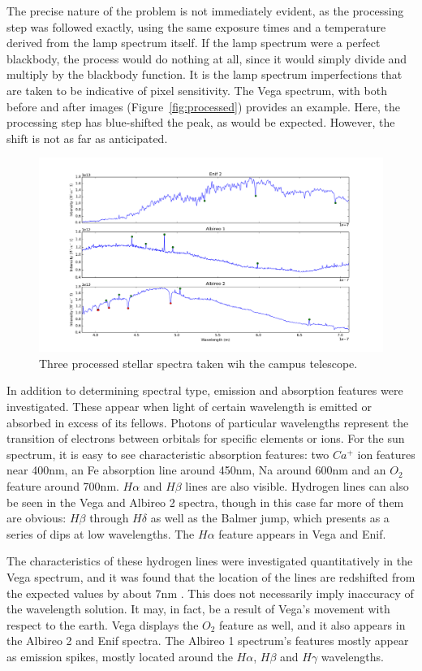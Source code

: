 \documentclass[a4paper,12pt]{article}
\begin{document}
The precise nature of the problem is not immediately evident, as the processing step was followed exactly, using the same exposure times and a temperature derived from the lamp spectrum itself. If the lamp spectrum were a perfect blackbody, the process would do nothing at all, since it would simply divide and multiply by the blackbody function. It is the lamp spectrum imperfections that are taken to be indicative of pixel sensitivity. The Vega spectrum, with both before and after images (Figure~\ref{fig:processed}) provides an example. Here, the processing step has blue-shifted the peak, as would be expected. However, the shift is not as far as anticipated.
\begin{figure}[!htbp]
\centering
\includegraphics[scale = 0.35]{telescope_binaries2.png}
\caption{Three processed stellar spectra taken wih the campus telescope.}
\label{fig:bin}
\end{figure}
In addition to determining spectral type, emission and absorption features were investigated. These appear when light of certain wavelength is emitted or absorbed in excess of its fellows. Photons of particular wavelengths represent the transition of electrons between orbitals for specific elements or ions. For the sun spectrum, it is easy to see characteristic absorption features: two $Ca^+$ ion features near 400nm, an Fe absorption line around 450nm, Na around 600nm and an $O_2$ feature around 700nm. $H\alpha$ and $H\beta$ lines are also visible. Hydrogen lines can also be seen in the Vega and Albireo 2 spectra, though in this case far more of them are obvious: $H\beta$ through $H\delta$ as well as the Balmer jump, which presents as a series of dips at low wavelengths. The $H\alpha$ feature appears in Vega and Enif.

The characteristics of these hydrogen lines were investigated quantitatively in the Vega spectrum, and it was found that the location of the lines are redshifted from the expected values by about 7nm \citep{hlines}. This does not necessarily imply inaccuracy of the wavelength solution. It may, in fact, be a result of Vega's movement with respect to the earth. Vega displays the $O_2$ feature as well, and it also appears in the Albireo 2 and Enif spectra. The Albireo 1 spectrum's features mostly appear as emission spikes, mostly located around the $H\alpha$, $H\beta$ and $H\gamma$ wavelengths.
\end{document}
